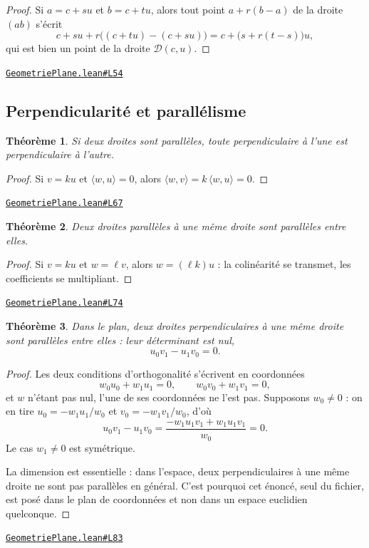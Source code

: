 \documentclass[11pt,a4paper]{article}
\theoremstyle{definition}
\theoremstyle{plain}
\newtheorem{theoreme}{Théorème}
\newcommand{\source}[2]{\par\smallskip\noindent\hfill{\footnotesize\href{#1}{\texttt{#2}}}\par\smallskip}
\begin{document}
\begin{proof}
Si $a = c + su$ et $b = c + tu$, alors tout point $a + r(b - a)$ de la droite $(ab)$
s'écrit
\[ c + su + r\bigl((c + tu) - (c + su)\bigr) = c + \bigl(s + r(t - s)\bigr)u , \]
qui est bien un point de la droite $\mathcal{D}(c, u)$.
\end{proof}
\source{https://github.com/Commutator-IO/learn-lean/blob/main/courses/01-college/02-geometrie-plane/GeometriePlane.lean\#L54}{GeometriePlane.lean\#L54}

\subsection{Perpendicularité et parallélisme}

\begin{theoreme}
Si deux droites sont parallèles, toute perpendiculaire à l'une est perpendiculaire à
l'autre.
\end{theoreme}

\begin{proof}
Si $v = ku$ et $\langle w, u\rangle = 0$, alors
$\langle w, v\rangle = k\,\langle w, u\rangle = 0$.
\end{proof}
\source{https://github.com/Commutator-IO/learn-lean/blob/main/courses/01-college/02-geometrie-plane/GeometriePlane.lean\#L67}{GeometriePlane.lean\#L67}

\begin{theoreme}
Deux droites parallèles à une même droite sont parallèles entre elles.
\end{theoreme}

\begin{proof}
Si $v = ku$ et $w = \ell v$, alors $w = (\ell k)u$ : la colinéarité se transmet, les
coefficients se multipliant.
\end{proof}
\source{https://github.com/Commutator-IO/learn-lean/blob/main/courses/01-college/02-geometrie-plane/GeometriePlane.lean\#L74}{GeometriePlane.lean\#L74}

\begin{theoreme}
Dans le plan, deux droites perpendiculaires à une même droite sont parallèles entre
elles : leur déterminant est nul,
\[ u_0 v_1 - u_1 v_0 = 0 . \]
\end{theoreme}

\begin{proof}
Les deux conditions d'orthogonalité s'écrivent en coordonnées
\[ w_0 u_0 + w_1 u_1 = 0, \qquad w_0 v_0 + w_1 v_1 = 0 , \]
et $w$ n'étant pas nul, l'une de ses coordonnées ne l'est pas. Supposons $w_0 \ne 0$ : on
en tire $u_0 = -w_1 u_1 / w_0$ et $v_0 = -w_1 v_1 / w_0$, d'où
\[ u_0 v_1 - u_1 v_0 = \frac{-w_1 u_1 v_1 + w_1 u_1 v_1}{w_0} = 0 . \]
Le cas $w_1 \ne 0$ est symétrique.

La dimension est essentielle : dans l'espace, deux perpendiculaires à une même droite ne
sont pas parallèles en général. C'est pourquoi cet énoncé, seul du fichier, est posé dans
le plan de coordonnées et non dans un espace euclidien quelconque.
\end{proof}
\source{https://github.com/Commutator-IO/learn-lean/blob/main/courses/01-college/02-geometrie-plane/GeometriePlane.lean\#L83}{GeometriePlane.lean\#L83}
\end{document}
